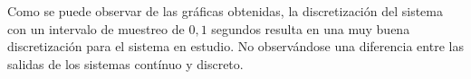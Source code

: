 \documentclass{article}
\begin{document}
Como se puede observar de las gráficas obtenidas, la discretización del sistema con un intervalo de muestreo de $0,1$ segundos resulta en una muy buena discretización para el sistema en estudio.
No observándose una diferencia entre las salidas de los sistemas contínuo y discreto.







    
\end{document}
